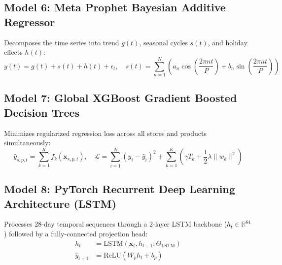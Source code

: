 \documentclass[12pt,a4paper,oneside]{report}
\theoremstyle{definition}
\begin{document}
\subsection{Model 6: Meta Prophet Bayesian Additive Regressor}
Decomposes the time series into trend $g(t)$, seasonal cycles $s(t)$, and holiday effects $h(t)$:
\begin{equation}
y(t) = g(t) + s(t) + h(t) + \epsilon_t, \quad s(t) = \sum_{n=1}^N \left(a_n \cos\left(\frac{2\pi n t}{P}\right) + b_n \sin\left(\frac{2\pi n t}{P}\right)\right)
\end{equation}

\subsection{Model 7: Global XGBoost Gradient Boosted Decision Trees}
Minimizes regularized regression loss across all stores and products simultaneously:
\begin{equation}
\hat{y}_{s,p,t} = \sum_{k=1}^K f_k(\mathbf{x}_{s,p,t}), \quad \mathcal{L} = \sum_{i=1}^N \left(y_i - \hat{y}_i\right)^2 + \sum_{k=1}^K \left(\gamma T_k + \frac{1}{2}\lambda \|w_k\|^2\right)
\end{equation}

\subsection{Model 8: PyTorch Recurrent Deep Learning Architecture (LSTM)}
Processes 28-day temporal sequences through a 2-layer LSTM backbone ($h_t \in \mathbb{R}^{64}$) followed by a fully-connected projection head:
\begin{align}
h_t &= \text{LSTM}\left(\mathbf{x}_t, h_{t-1}; \Theta_{\text{LSTM}}\right) \\
\hat{y}_{t+1} &= \text{ReLU}\left(W_p h_t + b_p\right)
\end{align}
\end{document}
